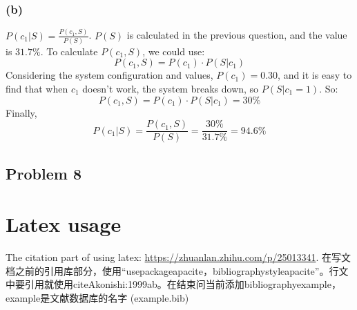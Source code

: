 \documentclass[a4paper]{article}
\begin{document}
\subsubsection{(b)}
$P(c_{1}|S)=\frac{P(c_{1},S)}{P(S)}$. $P(S)$ is calculated in the previous question, and the value is $31.7 \%$.
To calculate $P(c_{1},S)$, we could use:
\begin{equation}
	P(c_{1},S)=P(c_{1})\cdot P(S|c_{1})
\end{equation}
Considering the system configuration and values, $P(c_{1})=0.30$, and it is easy to find that when $c_{1}$ doesn't work, the system breaks down, so $P(S|c_{1}=1)$.
So:
\begin{equation}
	P(c_{1},S)=P(c_{1})\cdot P(S|c_{1})=30 \%
\end{equation}
Finally,
\begin{equation}
	P(c_{1}|S)=\frac{P(c_{1},S)}{P(S)}=\frac{30 \%}{31.7 \%}=94.6 \%
\end{equation}

\subsection{Problem 8}


\section{Latex usage}
The citation part of using latex: \url{https://zhuanlan.zhihu.com/p/25013341}.
在写文档之前的引用库部分，使用“usepackage{apacite}，bibliographystyle{apacite}”。行文中要引用就使用citeA{konishi:1999ab}。在结束问当前添加bibliography{example}，example是文献数据库的名字 (example.bib)



\end{document}
